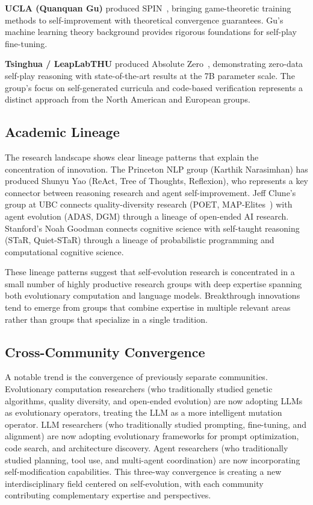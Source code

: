 \documentclass[11pt,a4paper]{article}
\begin{document}
\textbf{UCLA (Quanquan Gu)} produced SPIN~\citep{spin2024}, bringing game-theoretic training methods to self-improvement with theoretical convergence guarantees. Gu's machine learning theory background provides rigorous foundations for self-play fine-tuning.

\textbf{Tsinghua / LeapLabTHU} produced Absolute Zero~\citep{zhao2025absolute_zero}, demonstrating zero-data self-play reasoning with state-of-the-art results at the 7B parameter scale. The group's focus on self-generated curricula and code-based verification represents a distinct approach from the North American and European groups.

\subsection{Academic Lineage}

The research landscape shows clear lineage patterns that explain the concentration of innovation. The Princeton NLP group (Karthik Narasimhan) has produced Shunyu Yao (ReAct, Tree of Thoughts, Reflexion), who represents a key connector between reasoning research and agent self-improvement. Jeff Clune's group at UBC connects quality-diversity research (POET, MAP-Elites~\citep{mouret2015mapelites}) with agent evolution (ADAS, DGM) through a lineage of open-ended AI research. Stanford's Noah Goodman connects cognitive science with self-taught reasoning (STaR, Quiet-STaR) through a lineage of probabilistic programming and computational cognitive science.

These lineage patterns suggest that self-evolution research is concentrated in a small number of highly productive research groups with deep expertise spanning both evolutionary computation and language models. Breakthrough innovations tend to emerge from groups that combine expertise in multiple relevant areas rather than groups that specialize in a single tradition.

\subsection{Cross-Community Convergence}

A notable trend is the convergence of previously separate communities. Evolutionary computation researchers (who traditionally studied genetic algorithms, quality diversity, and open-ended evolution) are now adopting LLMs as evolutionary operators, treating the LLM as a more intelligent mutation operator. LLM researchers (who traditionally studied prompting, fine-tuning, and alignment) are now adopting evolutionary frameworks for prompt optimization, code search, and architecture discovery. Agent researchers (who traditionally studied planning, tool use, and multi-agent coordination) are now incorporating self-modification capabilities. This three-way convergence is creating a new interdisciplinary field centered on self-evolution, with each community contributing complementary expertise and perspectives.
\end{document}
